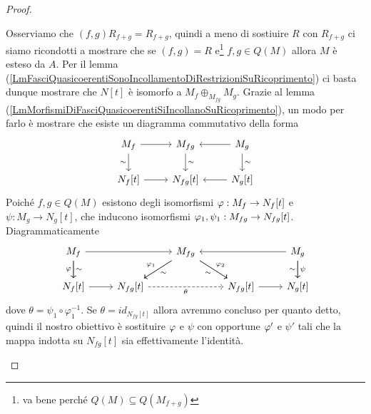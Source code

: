 \begin{proof}
\begin{itemize}
Osserviamo che $(f,g)R_{f+g}=R_{f+g}$, quindi a meno di sostiuire $R$ con $R_{f+g}$ ci siamo ricondotti a mostrare che se $(f,g)=R$ e\footnote{va bene perch\'e $Q(M)\subseteq Q(M_{f+g})$} $f,g\in Q(M)$ allora $M$ \`e esteso da $A$. Per il lemma (\ref{LmFasciQuasicoerentiSonoIncollamentoDiRestrizioniSuRicoprimento}) ci basta dunque mostrare che $N[t]$ \`e isomorfo a $M_f\oplus_{M_{fg}}M_g$. Grazie al lemma (\ref{LmMorfismiDiFasciQuasicoerentiSiIncollanoSuRicoprimento}), un modo per farlo \`e mostrare che esiste un diagramma commutativo della forma
\[\begin{tikzcd}
	{M_f} & {M_{fg}} & {M_g} \\
	{N_f[t]} & {N_{fg}[t]} & {N_g[t]}
	\arrow[from=1-1, to=1-2]
	\arrow["\sim"', from=1-1, to=2-1]
	\arrow["\sim", from=1-2, to=2-2]
	\arrow[from=1-3, to=1-2]
	\arrow["\sim", from=1-3, to=2-3]
	\arrow[from=2-1, to=2-2]
	\arrow[from=2-3, to=2-2]
\end{tikzcd}\]
Poich\'e $f,g\in Q(M)$ esistono degli isomorfismi $\varphi:M_f\to N_f[t]$ e $\psi:M_g\to N_g[t]$, che inducono isomorfismi $\varphi_1,\psi_1:M_{fg}\to N_{fg}[t]$. Diagrammaticamente
\[\begin{tikzcd}
	{M_f} && {M_{fg}} && {M_g} \\
	{N_f[t]} & {N_{fg}[t]} && {N_{fg}[t]} & {N_g[t]}
	\arrow[from=1-1, to=1-3]
	\arrow["\varphi"', from=1-1, to=2-1]
	\arrow["\sim", from=1-1, to=2-1]
	\arrow["{\varphi_1}"', from=1-3, to=2-2]
	\arrow["\sim", from=1-3, to=2-2]
	\arrow["{\varphi_2}", from=1-3, to=2-4]
	\arrow["\sim"', from=1-3, to=2-4]
	\arrow[from=1-5, to=1-3]
	\arrow["\psi", from=1-5, to=2-5]
	\arrow["\sim"', from=1-5, to=2-5]
	\arrow[from=2-1, to=2-2]
	\arrow["\theta"', dashed, from=2-2, to=2-4]
	\arrow[from=2-4, to=2-5]
\end{tikzcd}\]
dove $\theta=\psi_1\circ\varphi_1^{-1}$. Se $\theta=id_{N_{fg}[t]}$ allora avremmo concluso per quanto detto, quindi il nostro obiettivo \`e sostituire $\varphi$ e $\psi$ con opportune $\varphi'$ e $\psi'$ tali che la mappa indotta su $N_{fg}[t]$ sia effettivamente l'identit\`a.


\end{itemize}
\end{proof}
